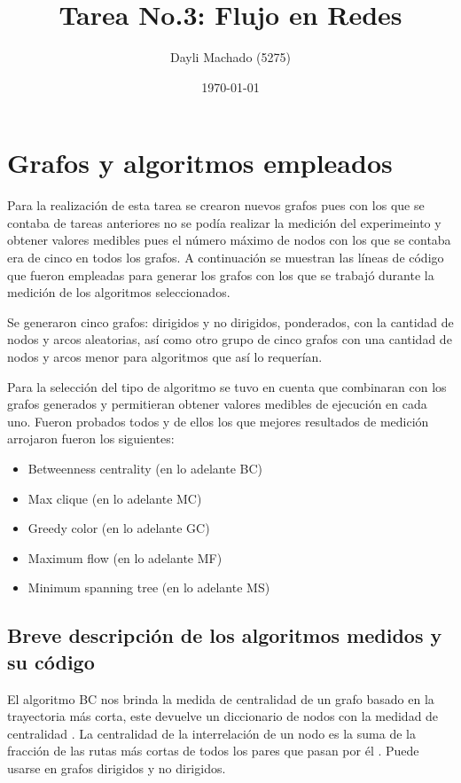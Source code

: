 \documentclass{article}
\begin{document}
\title{Tarea No.3: Flujo en Redes}
\author{Dayli Machado (5275)}
\date{\today}
\maketitle



\section{Grafos y algoritmos empleados}

Para la realización de esta tarea se crearon nuevos grafos pues con los que se contaba de tareas anteriores no se podía realizar la medición del experimeinto y obtener valores medibles pues el número máximo de nodos con los que se contaba era de cinco en todos los grafos.
A continuación se muestran las líneas de código que fueron empleadas para generar los grafos con los que se trabajó durante la medición de los algoritmos seleccionados.



Se generaron cinco grafos: dirigidos y no dirigidos, ponderados, con la cantidad de nodos y arcos aleatorias, así como otro grupo de cinco grafos con una cantidad de nodos y arcos menor para algoritmos que así lo requerían.

Para la selección del tipo de algoritmo se tuvo en cuenta que combinaran con los grafos generados y permitieran obtener valores medibles de ejecución en cada uno. Fueron probados todos y de ellos los que mejores resultados de medición arrojaron fueron los siguientes:

\begin{itemize}
\item Betweenness centrality (en lo adelante BC)
\item Max clique (en lo adelante MC)
\item Greedy color (en lo adelante GC)
\item Maximum flow (en lo adelante MF)
\item Minimum spanning tree (en lo adelante MS)
\end{itemize}

\subsection{Breve descripción de los algoritmos medidos y su código} 

El algoritmo BC nos brinda la medida de centralidad de un grafo basado en la trayectoria más corta, este devuelve un diccionario de nodos con la medidad de centralidad \cite{bc}.
La centralidad de la interrelación de un nodo es la suma de la fracción de las rutas más cortas de todos los pares que pasan por él \cite{bccentralidad}. Puede usarse en grafos dirigidos y no dirigidos.
\end{document}
